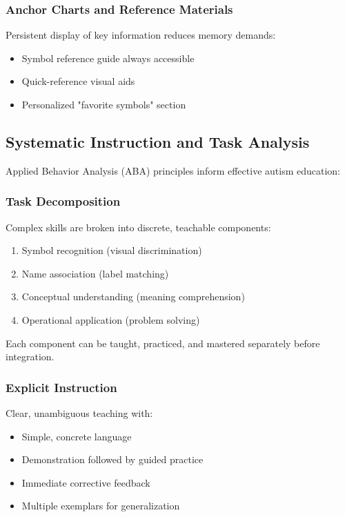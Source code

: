 \documentclass[12pt, a4paper]{article}
\begin{document}
\subsubsection{Anchor Charts and Reference Materials}

Persistent display of key information reduces memory demands:

\begin{itemize}[leftmargin=*]
    \item Symbol reference guide always accessible
    \item Quick-reference visual aids
    \item Personalized "favorite symbols" section
\end{itemize}

\subsection{Systematic Instruction and Task Analysis}

Applied Behavior Analysis (ABA) principles inform effective autism education:

\subsubsection{Task Decomposition}

Complex skills are broken into discrete, teachable components:

\begin{enumerate}[leftmargin=*]
    \item Symbol recognition (visual discrimination)
    \item Name association (label matching)
    \item Conceptual understanding (meaning comprehension)
    \item Operational application (problem solving)
\end{enumerate}

Each component can be taught, practiced, and mastered separately before integration.

\subsubsection{Explicit Instruction}

Clear, unambiguous teaching with:
\begin{itemize}[leftmargin=*]
    \item Simple, concrete language
    \item Demonstration followed by guided practice
    \item Immediate corrective feedback
    \item Multiple exemplars for generalization
\end{itemize}
\end{document}
